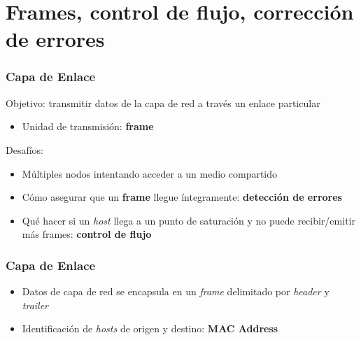 \documentclass[letter]{beamer}
\begin{document}
\section{Frames, control de flujo, corrección de errores}

\begin{frame}
  \frametitle{Capa de Enlace}
  
  Objetivo: transmitir datos de la capa de red a través un enlace particular
  
  \begin{itemize}
    \item Unidad de transmisión: {\bf frame}
  \end{itemize}
  
  Desafíos:
  \begin{itemize}
    \item Múltiples nodos intentando acceder a un medio compartido
    \item Cómo asegurar que un {\bf frame} llegue íntegramente: {\bf detección de errores}
    \item Qué hacer si un {\em host} llega a un punto de saturación y no puede recibir/emitir más frames:
          {\bf control de flujo}
  \end{itemize}

\end{frame}

\begin{frame}
  \frametitle{Capa de Enlace}
  
  \begin{itemize}
    \item Datos de capa de red se encapsula en un {\em frame} delimitado
          por {\em header} y {\em trailer}
    \item Identificación de {\em hosts} de origen y destino: {\bf MAC Address}
  \end{itemize}
\end{frame}
\end{document}

